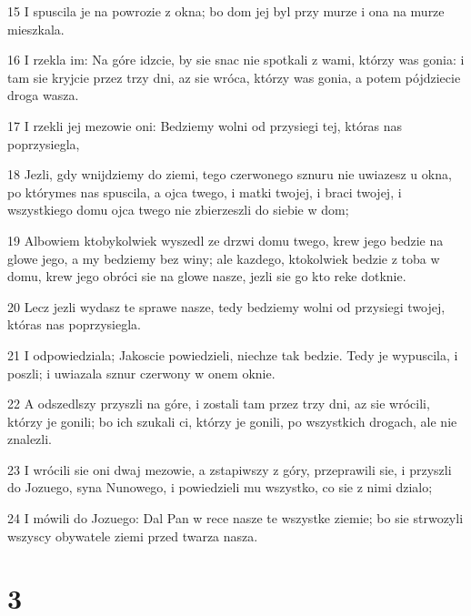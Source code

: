 \par 15 I spuscila je na powrozie z okna; bo dom jej byl przy murze i ona na murze mieszkala.
\par 16 I rzekla im: Na góre idzcie, by sie snac nie spotkali z wami, którzy was gonia: i tam sie kryjcie przez trzy dni, az sie wróca, którzy was gonia, a potem pójdziecie droga wasza.
\par 17 I rzekli jej mezowie oni: Bedziemy wolni od przysiegi tej, któras nas poprzysiegla,
\par 18 Jezli, gdy wnijdziemy do ziemi, tego czerwonego sznuru nie uwiazesz u okna, po którymes nas spuscila, a ojca twego, i matki twojej, i braci twojej, i wszystkiego domu ojca twego nie zbierzeszli do siebie w dom;
\par 19 Albowiem ktobykolwiek wyszedl ze drzwi domu twego, krew jego bedzie na glowe jego, a my bedziemy bez winy; ale kazdego, ktokolwiek bedzie z toba w domu, krew jego obróci sie na glowe nasze, jezli sie go kto reke dotknie.
\par 20 Lecz jezli wydasz te sprawe nasze, tedy bedziemy wolni od przysiegi twojej, któras nas poprzysiegla.
\par 21 I odpowiedziala; Jakoscie powiedzieli, niechze tak bedzie. Tedy je wypuscila, i poszli; i uwiazala sznur czerwony w onem oknie.
\par 22 A odszedlszy przyszli na góre, i zostali tam przez trzy dni, az sie wrócili, którzy je gonili; bo ich szukali ci, którzy je gonili, po wszystkich drogach, ale nie znalezli.
\par 23 I wrócili sie oni dwaj mezowie, a zstapiwszy z góry, przeprawili sie, i przyszli do Jozuego, syna Nunowego, i powiedzieli mu wszystko, co sie z nimi dzialo;
\par 24 I mówili do Jozuego: Dal Pan w rece nasze te wszystke ziemie; bo sie strwozyli wszyscy obywatele ziemi przed twarza nasza.

\chapter{3}

